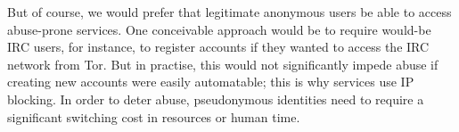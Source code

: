 \documentclass{llncs}
\newenvironment{tightlist}{\begin{list}{$\bullet$}{
  \setlength{\itemsep}{0mm}
    \setlength{\parsep}{0mm}
    }}{\end{list}}
\begin{document}
But of course, we would prefer that legitimate anonymous users be able to
access abuse-prone services.  One conceivable approach would be to require
would-be IRC users, for instance, to register accounts if they wanted to
access the IRC network from Tor.  But in practise, this would not
significantly impede abuse if creating new accounts were easily automatable;
this is why services use IP blocking.  In order to deter abuse, pseudonymous
identities need to require a significant switching cost in resources or human
time.


\end{document}
